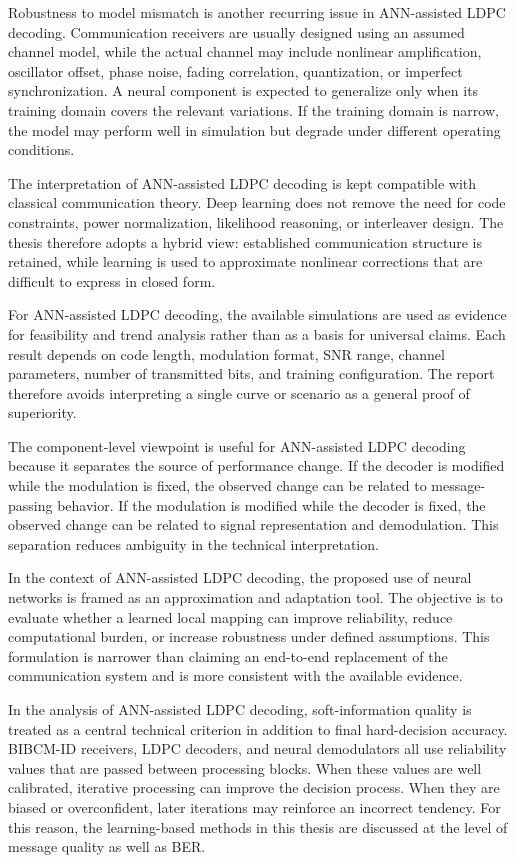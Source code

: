 Robustness to model mismatch is another recurring issue in ANN-assisted LDPC decoding. Communication receivers are usually designed using an assumed channel model, while the actual channel may include nonlinear amplification, oscillator offset, phase noise, fading correlation, quantization, or imperfect synchronization. A neural component is expected to generalize only when its training domain covers the relevant variations. If the training domain is narrow, the model may perform well in simulation but degrade under different operating conditions.

The interpretation of ANN-assisted LDPC decoding is kept compatible with classical communication theory. Deep learning does not remove the need for code constraints, power normalization, likelihood reasoning, or interleaver design. The thesis therefore adopts a hybrid view: established communication structure is retained, while learning is used to approximate nonlinear corrections that are difficult to express in closed form.

For ANN-assisted LDPC decoding, the available simulations are used as evidence for feasibility and trend analysis rather than as a basis for universal claims. Each result depends on code length, modulation format, SNR range, channel parameters, number of transmitted bits, and training configuration. The report therefore avoids interpreting a single curve or scenario as a general proof of superiority.

The component-level viewpoint is useful for ANN-assisted LDPC decoding because it separates the source of performance change. If the decoder is modified while the modulation is fixed, the observed change can be related to message-passing behavior. If the modulation is modified while the decoder is fixed, the observed change can be related to signal representation and demodulation. This separation reduces ambiguity in the technical interpretation.

In the context of ANN-assisted LDPC decoding, the proposed use of neural networks is framed as an approximation and adaptation tool. The objective is to evaluate whether a learned local mapping can improve reliability, reduce computational burden, or increase robustness under defined assumptions. This formulation is narrower than claiming an end-to-end replacement of the communication system and is more consistent with the available evidence.

In the analysis of ANN-assisted LDPC decoding, soft-information quality is treated as a central technical criterion in addition to final hard-decision accuracy. BIBCM-ID receivers, LDPC decoders, and neural demodulators all use reliability values that are passed between processing blocks. When these values are well calibrated, iterative processing can improve the decision process. When they are biased or overconfident, later iterations may reinforce an incorrect tendency. For this reason, the learning-based methods in this thesis are discussed at the level of message quality as well as BER.

